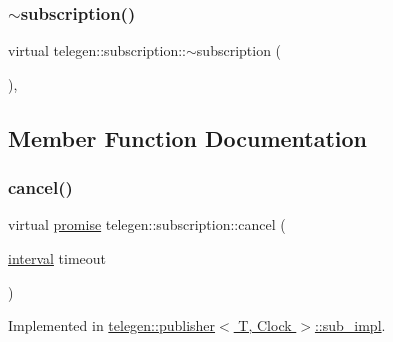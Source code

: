 \mbox{\label{classtelegen_1_1subscription_a2dcbdaadf0071d4f4485f018bceb7eb6}} 
\subsubsection{\texorpdfstring{$\sim$subscription()}{~subscription()}}
{\footnotesize\ttfamily virtual telegen\+::subscription\+::$\sim$subscription (\begin{DoxyParamCaption}{ }\end{DoxyParamCaption})\hspace{0.3cm}{\ttfamily [inline]}, {\ttfamily [virtual]}}



\subsection{Member Function Documentation}
\mbox{\label{classtelegen_1_1subscription_a7d645e1bf76477316d9f868a69467e42}} 
\subsubsection{\texorpdfstring{cancel()}{cancel()}}
{\footnotesize\ttfamily virtual \hyperlink{namespacetelegen_a9dd802bb5d30cf96b0c616750d43ae86}{promise} telegen\+::subscription\+::cancel (\begin{DoxyParamCaption}\item[{\hyperlink{namespacetelegen_ad925de2d0a99bc43918533abf0457344}{interval}}]{timeout }\end{DoxyParamCaption})\hspace{0.3cm}{\ttfamily [pure virtual]}}



Implemented in \hyperlink{classtelegen_1_1publisher_1_1sub__impl_ae0a84e8e0a45d21c688ee557c603c43d}{telegen\+::publisher$<$ T, Clock $>$\+::sub\+\_\+impl}.

\mbox{\label{classtelegen_1_1subscription_a84147a4afc90285df4c12d9243ffdece}} 
